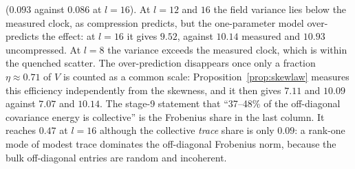 ($0.093$ against $0.086$ at $l=16$). At $l=12$ and $16$ the field variance lies below the measured clock, as compression predicts, but the one-parameter model
over-predicts the effect: at $l=16$ it gives $9.52$, against $10.14$ measured and $10.93$ uncompressed. At $l=8$ the variance exceeds the
measured clock, which is within the quenched scatter. The over-prediction disappears once only a fraction $\eta\approx0.71$ of $V$ is
counted as a common scale: Proposition~\ref{prop:skewlaw} measures this efficiency independently from the skewness, and it then gives
$7.11$ and $10.09$ against $7.07$ and $10.14$. The stage-9 statement that ``37--48\% of the off-diagonal covariance
energy is collective'' is the Frobenius share in the last column. It reaches $0.47$ at $l=16$ although the collective \emph{trace} share is
only $0.09$: a rank-one mode of modest trace dominates the off-diagonal Frobenius norm, because the bulk off-diagonal entries are
random and incoherent.
